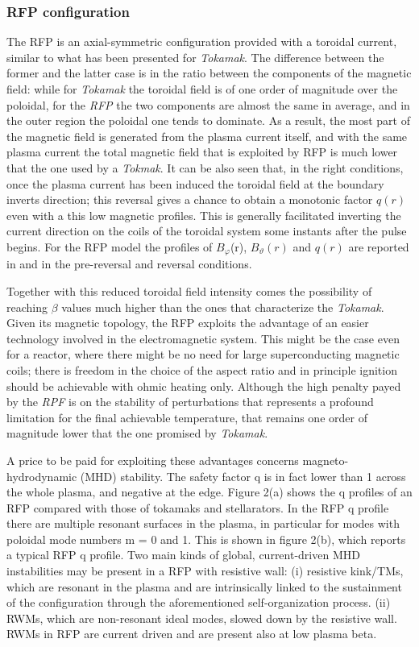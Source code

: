 \subsubsection{RFP configuration}
The \ac{RFP} is an axial-symmetric configuration provided with a toroidal current, similar to what has been presented for \textit{Tokamak}. The difference between the former and the latter case is in the ratio between the components of the magnetic field: while for \textit{Tokamak} the toroidal field is of one order of magnitude over the poloidal, for the \textit{RFP} the two components are almost the same in average, and in the outer region the poloidal one tends to dominate. As a result, the most part of the magnetic field is generated from the plasma current itself, and with the same plasma current the total magnetic field that is exploited by \acs{RFP} is much lower that the one used by a \textit{Tokmak}. It can be also seen that, in the right conditions, once the plasma current has been induced the toroidal field at the boundary inverts direction; this reversal gives a chance to obtain a monotonic factor $q(r)$ even with a this low magnetic profiles. This is generally facilitated inverting the current direction on the coils of the toroidal system some instants after the pulse begins. For the \acs{RFP} model the profiles of $B_\varphi$(r), $B_\vartheta(r)$ and $q(r)$ are reported in \Figure{\ref{fig:intro_safety_factor_profiles_b}} and \Figure{\ref{fig:intro_safety_factor_profiles_c}} in the pre-reversal and reversal conditions.

Together with this reduced toroidal field intensity comes the possibility of reaching $\beta$ values much higher than the ones that characterize the \textit{Tokamak}. 
Given its magnetic topology, the RFP exploits the advantage of an easier technology involved in the electromagnetic system. This might be the case even for a reactor, where there might be no need for large superconducting magnetic coils; there is freedom in the choice of the aspect ratio and in principle ignition should be achievable with ohmic heating only.  
Although the high penalty payed by the \textit{RPF} is on the stability of perturbations that represents a profound limitation for the final achievable temperature, that remains one order of magnitude lower that the one promised by \textit{Tokamak}.

A price to be paid for exploiting these advantages concerns magneto-hydrodynamic (MHD) stability. The safety factor q is in fact lower than 1 across the whole plasma, and negative at the edge. Figure 2(a) shows the q profiles of an RFP compared with those of tokamaks and stellarators. In the RFP q profile there are multiple resonant surfaces in the plasma, in particular for modes with poloidal mode numbers m = 0 and 1. This is shown in figure 2(b), which reports a typical RFP q profile. Two main kinds of global, current-driven MHD instabilities may be present in a RFP with resistive wall: (i) resistive kink/TMs, which are resonant in the plasma and are intrinsically linked to the sustainment of the configuration through the aforementioned self-organization process. (ii) RWMs, which are non-resonant ideal modes, slowed down by the resistive wall. RWMs in RFP are current driven and are present also at low plasma beta.


